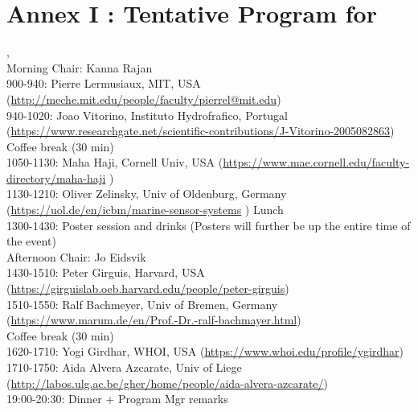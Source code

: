 \newpage
\section{Annex I : Tentative Program for \symp}
\label{sec:annex}

\vspace{3mm}

, \\
Morning Chair: Kanna Rajan\\
900-940: Pierre Lermusiaux, MIT, USA (\url{http://meche.mit.edu/people/faculty/pierrel@mit.edu})\\
940-1020: Joao Vitorino, Instituto Hydrofrafico, Portugal (\url{https://www.researchgate.net/scientific-contributions/J-Vitorino-2005082863})\\
Coffee break (30 min)\\
1050-1130: Maha Haji, Cornell Univ, USA (\url{https://www.mae.cornell.edu/faculty-directory/maha-haji} )\\
1130-1210: Oliver Zelinsky, Univ of Oldenburg, Germany (\url{https://uol.de/en/icbm/marine-sensor-systems} )
Lunch \\
1300-1430: Poster session and drinks (Posters will further be up the entire time of the event) \\
Afternoon Chair: Jo Eidsvik \\
1430-1510: Peter Girguis, Harvard, USA (\url{https://girguislab.oeb.harvard.edu/people/peter-girguis}) \\
1510-1550: Ralf Bachmeyer, Univ of Bremen, Germany (\url{https://www.marum.de/en/Prof.-Dr.-ralf-bachmayer.html})\\
Coffee break (30 min)\\
1620-1710: Yogi Girdhar, WHOI, USA (\url{https://www.whoi.edu/profile/ygirdhar}) \\
1710-1750: Aida Alvera Azcarate, Univ of Liege (\url{http://labos.ulg.ac.be/gher/home/people/aida-alvera-azcarate/})\\
19:00-20:30: Dinner + Program Mgr remarks

\vspace{5mm}

